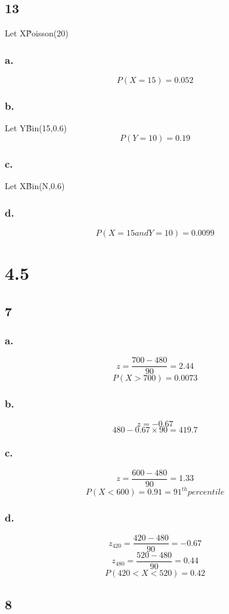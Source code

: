 \documentclass[11pt]{article}
\begin{document}
\subsection*{13}
Let X\~Poisson(20)
\subsubsection*{a.} 
\[ P(X=15) = 0.052 \]
\subsubsection*{b.}
Let Y\~Bin(15,0.6)
\[ P(Y=10) = 0.19 \]

\subsubsection*{c.}
Let X\~Bin(N,0.6)

\subsubsection*{d.}
\[P(X=15 and Y=10) = 0.0099 \]

\section*{4.5}
\subsection*{7}
\subsubsection*{a.}
\[ z = \frac{700-480}{90} = 2.44 \]
\[ P(X>700) = 0.0073 \]
\subsubsection*{b.}
\[ z = -0.67 \]
\[ 480 - 0.67 \times 90 = 419.7 \]
\subsubsection*{c.}
\[ z = \frac{600 - 480}{90} = 1.33 \]
\[ P(X<600) = 0.91 = 91^{th} percentile \]
\subsubsection*{d.}
\[ z_{420} = \frac{420-480}{90} = -0.67 \]
\[ z_{480} = \frac{520-480}{90} = 0.44 \]
\[ P(420 < X < 520) = 0.42 \]
\subsection*{8}
\end{document}
